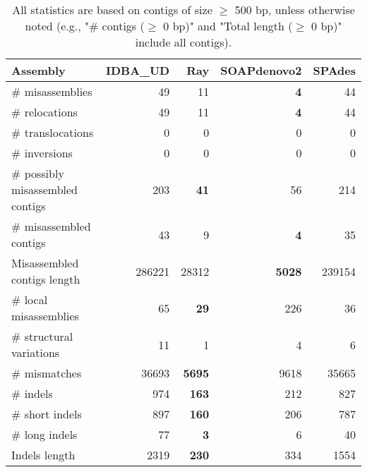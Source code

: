 \documentclass[12pt,a4paper]{article}
\begin{document}
\begin{table}[ht]
\begin{center}
\caption{All statistics are based on contigs of size $\geq$ 500 bp, unless otherwise noted (e.g., "\# contigs ($\geq$ 0 bp)" and "Total length ($\geq$ 0 bp)" include all contigs).}
\begin{tabular}{|l*{4}{|r}|}
\hline
Assembly & IDBA\_UD & Ray & SOAPdenovo2 & SPAdes \\ \hline
\# misassemblies & 49 & 11 & {\bf 4} & 44 \\ \hline
\hspace{5mm}\# relocations & 49 & 11 & {\bf 4} & 44 \\ \hline
\hspace{5mm}\# translocations & 0 & 0 & 0 & 0 \\ \hline
\hspace{5mm}\# inversions & 0 & 0 & 0 & 0 \\ \hline
\# possibly misassembled contigs & 203 & {\bf 41} & 56 & 214 \\ \hline
\# misassembled contigs & 43 & 9 & {\bf 4} & 35 \\ \hline
Misassembled contigs length & 286221 & 28312 & {\bf 5028} & 239154 \\ \hline
\# local misassemblies & 65 & {\bf 29} & 226 & 36 \\ \hline
\# structural variations & 11 & 1 & 4 & 6 \\ \hline
\# mismatches & 36693 & {\bf 5695} & 9618 & 35665 \\ \hline
\# indels & 974 & {\bf 163} & 212 & 827 \\ \hline
\hspace{5mm}\# short indels & 897 & {\bf 160} & 206 & 787 \\ \hline
\hspace{5mm}\# long indels & 77 & {\bf 3} & 6 & 40 \\ \hline
Indels length & 2319 & {\bf 230} & 334 & 1554 \\ \hline
\end{tabular}
\end{center}
\end{table}
\end{document}
